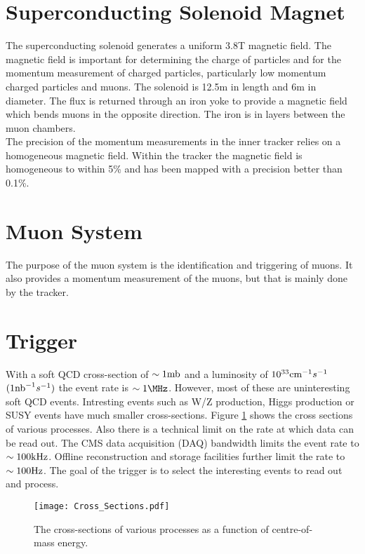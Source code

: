 \section{Superconducting Solenoid Magnet}

The superconducting solenoid generates a uniform 3.8T magnetic field. The 
magnetic field is important for determining the charge of particles and for the 
momentum measurement of charged particles, particularly low momentum charged 
particles and muons. The solenoid is 12.5m in length and 6m in diameter. The flux 
is returned through an iron yoke to provide a magnetic field which bends muons in 
the opposite direction. The iron is in layers between the muon chambers. \\

The precision of the momentum measurements in the inner tracker relies on a
homogeneous magnetic field. Within the tracker the magnetic field is homogeneous
to within 5\% and has been mapped with a precision better than 0.1\%.

\section{Muon System}

The purpose of the muon system is the identification and triggering of muons. It
also provides a momentum measurement of the muons, but that is mainly done by the 
tracker. \\

\section{Trigger}

With a soft QCD cross-section of $\sim1\mbox{mb}$ and a luminosity of
$10^{33}\mbox{cm}^{-1}s^{-1}$ $(1\mbox{nb}^{-1} s^{-1})$ the event rate is $\sim 1 \MHz$. 
However, most of these are uninteresting soft QCD events. Intresting events such
as W/Z production, Higgs production or SUSY events have much smaller 
cross-sections. Figure \ref{fig:cross_sections} shows the cross sections of
various processes. Also there is a technical limit on the rate at which data can
be read out. The CMS data acquisition (DAQ) bandwidth limits the event rate to 
$\sim 100\mbox{kHz}$. Offline reconstruction and storage facilities further limit the
rate to $\sim 100\mbox{Hz}$. The goal of the trigger is to select the interesting 
events to read out and process. \\

\begin{figure}
\begin{center}
\texttt{[image: Cross\_Sections.pdf]}
\end{center}
\caption{The cross-sections of various processes as a function of centre-of-mass
energy.}
\label{fig:cross_sections}
\end{figure}

